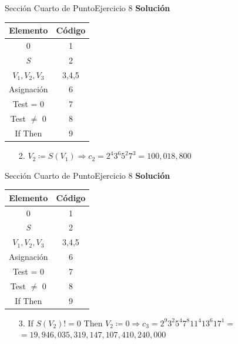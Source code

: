 \documentclass[10pt, envcountsect, presentation, aspectratio=169]{beamer}
\begin{document}

\begin{frame}{Sección Cuarto de Punto}{Ejercicio 8}
    \textbf{Solución}\\
    \begin{table}[h]
        \centering
        \renewcommand{\arraystretch}{1.2}
        \begin{tabular}{|c|c|}
            \hline
            \textbf{Elemento} & \textbf{Código} \\
            \hline
            0 & 1 \\
            \hline
            \textit{S} & 2 \\
            \hline
            $V_1, V_2, V_3$ & 3,4,5 \\
            \hline
            Asignación & 6 \\
            \hline
            Test = 0 & 7 \\
            \hline
            Test $\neq$ 0 & 8 \\
            \hline
            If Then & 9 \\
            \hline
        \end{tabular}
    \end{table}
    \begin{itemize}
        \item[2.] $V_2 \coloneqq S(V_1) \Rightarrow c_2 = 2^4 3^6 5^2 7^3 = 100,018,800$
    \end{itemize}
\end{frame}


\begin{frame}{Sección Cuarto de Punto}{Ejercicio 8}
    \textbf{Solución}\\
    \begin{table}[h]
        \centering
        \renewcommand{\arraystretch}{1.2}
        \begin{tabular}{|c|c|}
            \hline
            \textbf{Elemento} & \textbf{Código} \\
            \hline
            0 & 1 \\
            \hline
            \textit{S} & 2 \\
            \hline
            $V_1, V_2, V_3$ & 3,4,5 \\
            \hline
            Asignación & 6 \\
            \hline
            Test = 0 & 7 \\
            \hline
            Test $\neq$ 0 & 8 \\
            \hline
            If Then & 9 \\
            \hline
        \end{tabular}
    \end{table}
    \begin{itemize}
        \item[3.] If $S(V_2)!=0$ Then $V_2 \coloneqq0 \Rightarrow c_3 = 2^9 3^2 5^4 7^8 11^4 13^6 17^1 = $\\
        $=19,946,035,319,147,107,410,240,000$
    \end{itemize}
\end{frame}
\end{document}
